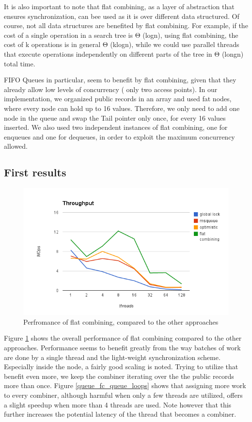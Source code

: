 It is also important to note that flat combining, as a layer of abstraction that ensures synchronization, can bee used as it is over different data structured. Of course, not all data structures are benefited by flat combining. For example, if the cost of a single operation in a search tree is \textgreek{Θ} (logn), using flat combining, the cost of k operations is in general \textgreek{Θ} (klogn), while we could  use parallel threads that execute operations independently on different parts of the tree in \textgreek{Θ} (longn) total time.

FIFO Queues in particular, seem to benefit by flat combining, given that they already allow low levels of concurrency ( only two access points). In our implementation, we organized public records in an array and used fat nodes, where every node can hold up to 16 values. Therefore, we only need to add one node in the queue and swap the Tail pointer only once, for every 16 values inserted. We also used two independent instances of flat combining, one for enqueues and one for dequeues, in order to exploit the maximum concurrency allowed.

\subsection{First results}
 
\begin{figure}
 \centering
  \includegraphics[scale=0.7]{queue_fc_queue_perf.png}
\caption{Perfromance of flat combining, compared to the other approaches}
\label{queue_fc_queue_perf}
\end{figure}

Figure \ref{queue_fc_queue_perf} shows the overall performance of flat combining compared to the other approaches. Performance seems to benefit greatly from the way batches of work are done by a single thread and the light-weight synchronization scheme. Especially inside the node, a fairly good scaling is noted. Trying to utilize that benefit even more, we keep the combiner iterating over the the public records more than once. Figure \ref{queue_fc_queue_loops} shows that assigning more work to every combiner, although harmful when only a few threads are utilized, offers a slight speedup when more than 4 threads are used. Note however that this further increases the potential latency of the thread that becomes a combiner. 


